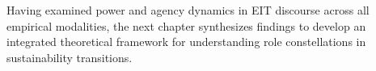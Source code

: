 \documentclass[../main.tex]{subfiles}
\begin{document}
\vspace{1em}
Having examined power and agency dynamics in EIT discourse across all empirical modalities, the next chapter synthesizes findings to develop an integrated theoretical framework for understanding role constellations in sustainability transitions.
\end{document}
